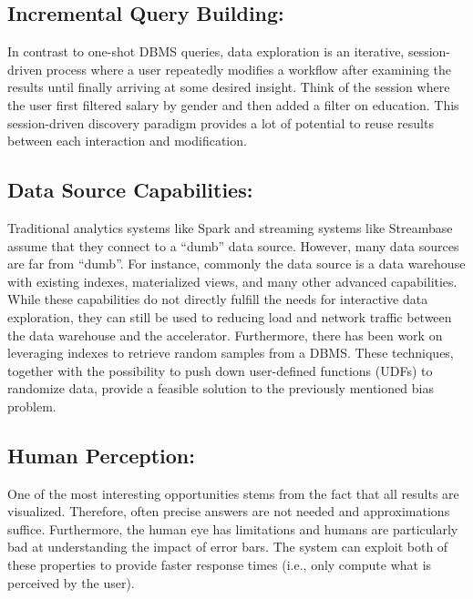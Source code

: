 \documentclass[12pt,letterpaper, onecolumn]{exam}
\begin{document}
    \subsection{Incremental Query Building:}
     In contrast to one-shot DBMS queries, data exploration is an iterative, session-driven process where a user repeatedly modifies a workflow after examining the results until finally arriving at some desired insight. Think of the session where the user first filtered salary by gender and then added a filter on education. This session-driven discovery paradigm provides a lot of potential to reuse results between each interaction and modification.
     
     \subsection{Data Source Capabilities:} 
     Traditional analytics systems like Spark and streaming systems like Streambase assume that they connect to a “dumb” data source. However, many data sources are far from “dumb”. For instance, commonly the data source is a data warehouse with existing indexes, materialized views, and many other advanced capabilities. While these capabilities do not directly fulfill the needs for interactive data exploration, they can still be used to reducing load and network traffic between the data warehouse and the accelerator. Furthermore, there has been work on leveraging indexes to retrieve random samples from a DBMS. These techniques, together with the possibility to push down user-defined functions (UDFs) to randomize data, provide a feasible solution to the previously mentioned bias problem.
     
     \subsection{Human Perception:} 
     One of the most interesting opportunities stems from the fact that all results are visualized. Therefore, often precise answers are not needed and approximations suffice. Furthermore, the human eye has limitations and humans are particularly bad at understanding the impact of error bars. The system can exploit both of these properties to provide faster response times (i.e., only compute what is perceived by the user).
\end{document}
